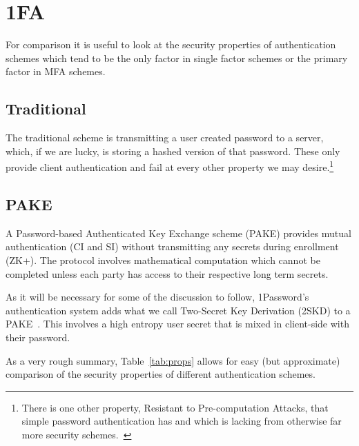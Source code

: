 \documentclass[12pt]{article}
\newcommand{\prop}[1]{\textsf{#1}}
\begin{document}
\section{1FA}

For comparison it is useful to look at the security properties
of authentication schemes which tend to be the only factor in single
factor schemes or the primary factor in MFA schemes.

\subsection{Traditional}
The traditional scheme is transmitting a user created password to a server, which, if we are lucky, is storing a hashed version of that password. These only provide client authentication and fail at every other property we may desire.\footnote{There is one other property, Resistant to Pre-computation Attacks, that simple password authentication has and which is lacking from otherwise far more security schemes.~\autocite{JareckiETAL2018:OPAQUE}}

\subsection{PAKE}
A Password-based Authenticated Key Exchange scheme (PAKE) provides mutual authentication (\prop{CI} and \prop{SI}) without transmitting any secrets during enrollment (\prop{ZK+}). The protocol involves mathematical computation which cannot be completed unless each party has access to their respective long term secrets.

As it will be necessary for some of the discussion to follow,
1Password's authentication system adds what we call
Two-Secret Key Derivation (2SKD) to a PAKE~\autocite{1Password:whitepaper}.
This involves a
high entropy user secret that is mixed in client-side with their password.

As a very rough summary, Table~\ref{tab:props} allows for easy
(but approximate) comparison of the security properties of different
authentication schemes.
\end{document}
